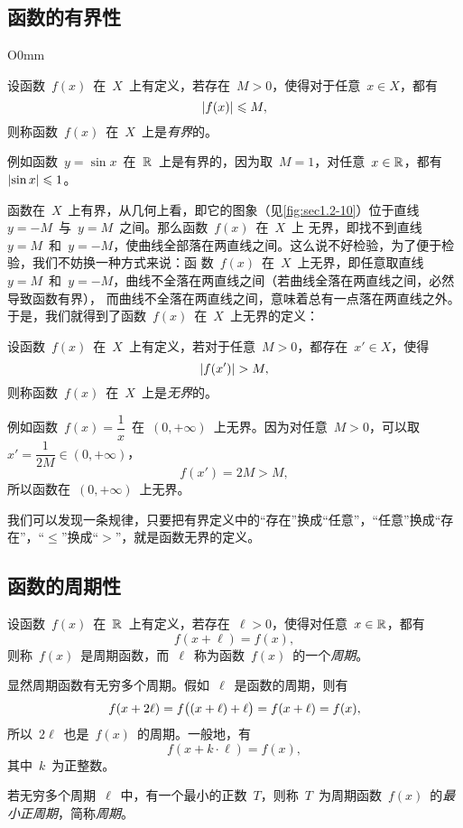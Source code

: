 \subsection{函数的有界性}

\begin{wrapfigure}[10]{O}{0mm}
\somefigure
\caption{有界函数}\label{fig:sec1.2-10}
\end{wrapfigure}

设函数~$f(x)$~在~$X$~上有定义，若存在~$M>0$，使得对于任意~$x\in X$，都有
\[
  \lvert f(x)\rvert\leqslant M,
\]
则称函数~$f(x)$~在~$X$~上是\emph{有界}的。

例如函数~$y=\sin x$~在~$\mathbb{R}$~上是有界的，因为取~$M=1$，对任意~$x\in\mathbb{R}$，都有~$\lvert\sin x\rvert\leqslant1$。

函数在~$X$~上有界，从几何上看，即它的图象（见\ref{fig:sec1.2-10}）位于直线~$y=-M$~与~$y=M$~之间。那么函数~$f(x)$~在~$X$~上
无界，即找不到直线~$y=M$~和~$y=-M$，使曲线全部落在两直线之间。这么说不好检验，为了便于检验，我们不妨换一种方式来说：函
数~$f(x)$~在~$X$~上无界，即任意取直线~$y=M$~和~$y=-M$，曲线不全落在两直线之间（若曲线全落在两直线之间，必然导致函数有界），%
而曲线不全落在两直线之间，意味着总有一点落在两直线之外。%
于是，我们就得到了函数~$f(x)$~在~$X$~上无界的定义：

设函数~$f(x)$~在~$X$~上有定义，若对于任意~$M>0$，都存在~$x'\in X$，使得
\[
  \lvert f(x')\rvert>M,
\]
则称函数~$f(x)$~在~$X$~上是\emph{无界}的。

例如函数~$f(x)=\dfrac1x$~在~$(0,+\infty)$~上无界。因为对任意~$M>0$，可以取~$x'=\dfrac1{2M}\in(0,+\infty)$，
\[
  f(x')=2M>M,
\]
所以函数在~$(0,+\infty)$~上无界。

我们可以发现一条规律，只要把有界定义中的“存在”换成“任意”，“任意”换成“存在”，“$\leq$”换成“$>$”，就是函数无界的定义。

\subsection{函数的周期性}

设函数~$f(x)$~在~$\mathbb{R}$~上有定义，若存在~$\ell>0$，使得对任意~$x\in\mathbb{R}$，都有
\[
  f(x+\ell)=f(x),
\]
则称~$f(x)$~是周期函数，而~$\ell$~称为函数~$f(x)$~的一个\emph{周期}。

显然周期函数有无穷多个周期。假如~$\ell$~是函数的周期，则有
\[
  f(x+2\ell)=f\bigl\lparen(x+\ell)+\ell\bigr\rparen=f(x+\ell)=f(x),
\]
所以~$2\ell$~也是~$f(x)$~的周期。一般地，有
\[
  f(x+k\cdot\ell)=f(x),
\]
其中~$k$~为正整数。

若无穷多个周期~$\ell$~中，有一个最小的正数~$T$，则称~$T$~为周期函数~$f(x)$~的\emph{最小正周期}，简称\emph{周期}。

